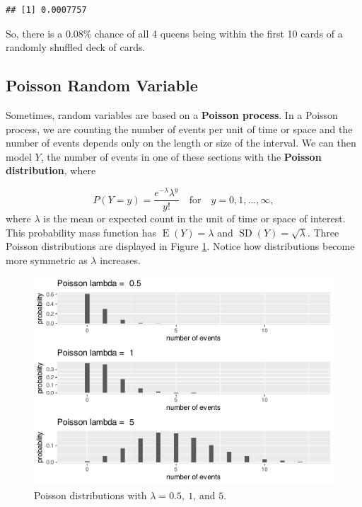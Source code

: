 \documentclass[
]{krantz}
\newcommand{\E}{\operatorname{E}}
\newcommand{\SD}{\operatorname{SD}}
\begin{document}
\begin{verbatim}
## [1] 0.0007757
\end{verbatim}

So, there is a 0.08\% chance of all 4 queens being within the first 10 cards of a randomly shuffled deck of cards.

\hypertarget{poisson-random-variable}{%
\subsection{Poisson Random Variable}\label{poisson-random-variable}}

Sometimes, random variables are based on a \textbf{Poisson process}.  In a Poisson process, we are counting the number of events per unit of time or space and the number of events depends only on the length or size of the interval.
We can then model \(Y\), the number of events in one of these sections with the \textbf{Poisson distribution},  where

\begin{equation}
P(Y=y) = \frac{e^{-\lambda}\lambda^y}{y!} \quad \textrm{for} \quad y = 0, 1, \ldots, \infty,
\label{eq:poissRV}
\end{equation}
where \(\lambda\) is the mean or expected count in the unit of time or space of interest.
This probability mass function has \(\E(Y) = \lambda\) and \(\SD(Y) = \sqrt{\lambda}\). Three Poisson distributions are displayed in Figure \ref{fig:multPois}. Notice how distributions become more symmetric as \(\lambda\) increases.



\begin{figure}

{\centering \includegraphics[width=0.6\linewidth]{bookdown-BeyondMLR_files/figure-latex/multPois-1} 

}

\caption{Poisson distributions with \(\lambda = 0.5,\ 1\), and \(5\).}\label{fig:multPois}
\end{figure}
\end{document}
